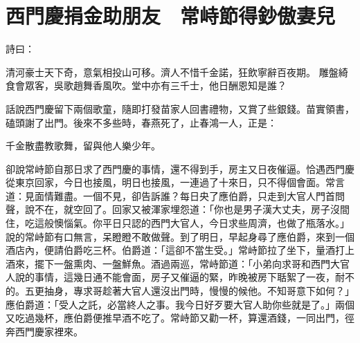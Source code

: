 %

\chapter{西門慶捐金助朋友　常峙節得鈔傲妻兒}

詩曰：

清河豪士天下奇，意氣相投山可移。濟人不惜千金諾，狂飲寧辭百夜期。
雕盤綺食會眾客，吳歌趙舞香風吹。堂中亦有三千士，他日酬恩知是誰？

話說西門慶留下兩個歌童，隨即打發苗家人回書禮物，又賞了些銀錢。苗實領書，磕頭謝了出門。後來不多些時，春燕死了，止春鴻一人，正是：

千金散盡教歌舞，留與他人樂少年。

卻說常峙節自那日求了西門慶的事情，還不得到手，房主又日夜催逼。恰遇西門慶從東京回家，今日也接風，明日也接風，一連過了十來日，只不得個會面。常言道：見面情難盡。一個不見，卻告訴誰？每日央了應伯爵，只走到大官人門首問聲，說不在，就空回了。回家又被渾家埋怨道：「你也是男子漢大丈夫，房子沒間住，吃這般懊惱氣。你平日只認的西門大官人，今日求些周濟，也做了瓶落水。」說的常峙節有口無言，呆瞪瞪不敢做聲。到了明日，早起身尋了應伯爵，來到一個酒店內，便請伯爵吃三杯。伯爵道：「這卻不當生受。」常峙節拉了坐下，量酒打上酒來，擺下一盤熏肉、一盤鮮魚。酒過兩巡，常峙節道：「小弟向求哥和西門大官人說的事情，這幾日通不能會面，房子又催逼的緊，昨晚被房下聒絮了一夜，耐不的。五更抽身，專求哥趁著大官人還沒出門時，慢慢的候他。不知哥意下如何？」應伯爵道：「受人之託，必當終人之事。我今日好歹要大官人助你些就是了。」兩個又吃過幾杯，應伯爵便推早酒不吃了。常峙節又勸一杯，算還酒錢，一同出門，徑奔西門慶家裡來。

